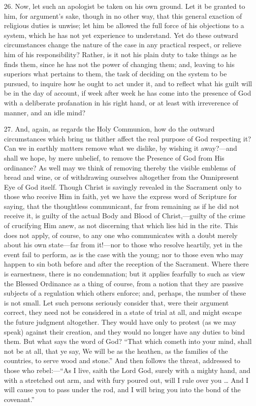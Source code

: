 26. Now, let such an apologist be taken on his own ground. Let it
be granted to him, for argument's sake, though in no other way, that
this general exaction of religious duties is unwise; let him be
allowed the full force of his objections to a system, which he has not
yet experience to understand. Yet do these outward circumstances
change the nature of the case in any practical respect, or relieve him
of his responsibility? Rather, is it not his plain duty to take things
as he finds them, since he has not the power of changing them; and,
leaving to his superiors what pertains to them, the task of deciding
on the system to be pursued, to inquire how he ought to act under it,
and to reflect what his guilt will be in the day of account, if week
after week he has come into the presence of God with a deliberate
profanation in his right hand, or at least with irreverence of manner,
and an idle mind?

27. And, again, as regards the Holy Communion, how do the outward
circumstances which bring us thither affect the real purpose of God
respecting it? Can we in earthly matters remove what we dislike, by
wishing it away?—and shall we hope, by mere unbelief, to remove the
Presence of God from His ordinance? As well may we think of removing
thereby the visible emblems of bread and wine, or of withdrawing
ourselves altogether from the Omnipresent Eye of God itself. Though
Christ is savingly revealed in the Sacrament only to those who receive
Him in faith, yet we have the express word of Scripture for saying,
that the thoughtless communicant, far from remaining as if he did not
receive it, is guilty of the actual Body and Blood of Christ,—guilty
of the crime of crucifying Him anew, as not discerning that which lies
hid in the rite. This does not apply, of course, to any one who
communicates with a doubt merely about his own state—far from it!—nor
to those who resolve heartily, yet in the event fail to perform, as is
the case with the young; nor to those even who may happen to sin both
before and after the reception of the Sacrament. Where there is
earnestness, there is no condemnation; but it applies fearfully to
such as view the Blessed Ordinance as a thing of course, from a notion
that they are passive subjects of a regulation which others enforce;
and, perhaps, the number of these is not small. Let such persons
seriously consider that, were their argument correct, they need not be
considered in a state of trial at all, and might escape the future
judgment altogether. They would have only to protest (as we may speak)
against their creation, and they would no longer have any duties to
bind them. But what says the word of God? ``That which cometh into
your mind, shall not be at all, that ye say, We will be as the
heathen, as the families of the countries, to serve wood and
stone.'' And then follows the threat, addressed to those who
rebel:—``As I live, saith the Lord God, surely with a mighty
hand, and with a stretched out arm, and with fury poured out, will I
rule over you … And I will cause you to pass under the rod, and I
will bring you into the bond of the covenant.''

